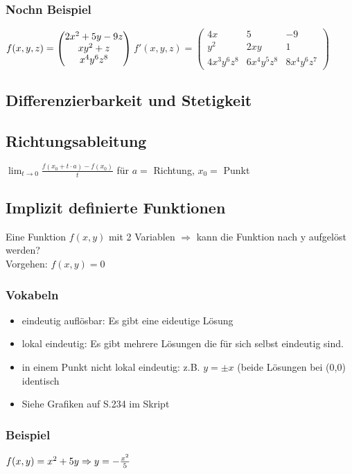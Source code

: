 \documentclass[a4paper,portrait]{scrartcl}
\begin{document}
\subsubsection*{Nochn Beispiel}
$ f(x,y,z) =
\begin{pmatrix}
2x^2+5y-9z \\
xy^2+z \\
x^4y^6z^8
\end{pmatrix} \\
$$
f'(x,y,z) =
\begin{pmatrix}
4x & 5 & -9\\
y^2 & 2xy & 1 \\
4x^3y^6z^8 & 6x^4y^5z^8 & 8x^4y^6z^7
\end{pmatrix}
$
\subsection{Differenzierbarkeit und Stetigkeit}
\subsection{Richtungsableitung}

$\lim_{t \rightarrow 0}\frac{f(x_0+t \cdot a)-f(x_0)}{t}$ für $a = $ Richtung, $x_0 = $ Punkt
\subsection{Implizit definierte Funktionen}
Eine Funktion $f(x,y)$ mit 2 Variablen $\Rightarrow$ kann die Funktion nach y aufgelöst werden? \\
Vorgehen: $f(x,y) = 0$ \\
\subsubsection*{Vokabeln}
\begin{itemize}
	\item eindeutig auflösbar: Es gibt eine eideutige Lösung
	\item lokal eindeutig: Es gibt mehrere Lösungen die für sich selbst eindeutig sind.
	\item in einem Punkt nicht lokal eindeutig: z.B. $y=\pm x$ (beide Lösungen bei (0,0) identisch
	\item Siehe Grafiken auf S.234 im Skript
\end{itemize}
\subsubsection*{Beispiel}
$f(x,y) = x^2+5y \\
\Rightarrow y = -\frac{x^2}{5}$
\end{document}
